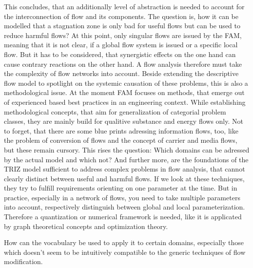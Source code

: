 \documentclass[a4paper,11pt]{article}
\begin{document}
        This concludes, that an additionally level of abstraction is needed to account for the interconnection of flow and its components. The question
        is, how it can be modelled that a stagnation zone is only bad for useful flows but can be used to reduce harmful flows?
        At this point, only singular flows are issued by the FAM, meaning that it is not clear, if a global flow system is issued or a specific local flow.
        But it has to be considered, that synergistic effects on the one hand can cause contrary reactions on the other hand. A flow analysis therefore must 
        take the complexity of flow networks into account. Beside extending the descriptive flow model to spotlight on the systemic causation of these problems, 
        this is also a methodological issue. At the moment FAM focuses on methods, that emerge out of experienced based best practices in an engineering context.
        While establishing methodological concepts, that aim for generalization of categorial problem classes,
        they are mainly build for qualitive substance and energy flows only. Not to forget, that there are some blue prints adressing information flows, too, like
        the problem of conversion of flows and the concept of carrier and media flows, but these remain cursory.
        This rises the question: Which domains can be adressed by the actual model and which not? And further more, are the foundations of the TRIZ model sufficient to address complex problems in flow analysis, that cannot clearly distinct between
        useful and harmful flows. If we look at these techniques, they try to fulfill requirements orienting on one parameter at the time.
        But in practice, especially in a network of flows, you need to take multiple parameters into account, respectively distinguish between global and local
        parameterization. Therefore a quantization or numerical framework is needed, like it is applicated by graph theoretical concepts and optimization theory. 
        
         



         

        How can the vocabulary be used to apply it to certain domains, especially those which doesn't seem to be intuitively compatible to the generic techniques
        of flow modification. 
\end{document}
